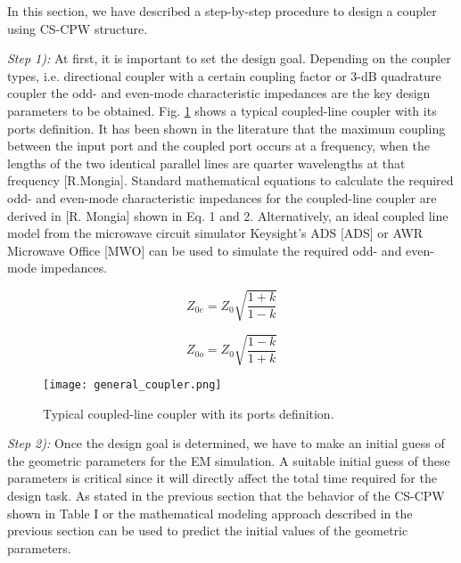 \documentclass[journal]{IEEEtran}
\begin{document}
In this section, we have described a step-by-step procedure to design a coupler using CS-CPW structure. 

\textit{Step 1):} At first, it is important to set the design goal. Depending on the coupler types, i.e. directional coupler with a certain coupling factor or 3-dB quadrature coupler the odd- and even-mode characteristic impedances are the key design parameters to be obtained. Fig. \ref{bcoupler} shows a typical coupled-line coupler with its ports definition. It has been shown in the literature that the maximum coupling between the input port and the coupled port occurs at a frequency, when the lengths of the two identical parallel lines are quarter wavelengths at that frequency [R.Mongia]. Standard mathematical equations to calculate the required odd- and even-mode characteristic impedances for the coupled-line coupler are derived in [R. Mongia] shown in Eq. 1 and 2. Alternatively, an ideal coupled line model from the microwave circuit simulator Keysight's ADS [ADS] or AWR Microwave Office [MWO] can be used to simulate the required odd- and even-mode impedances.

\begin{equation}
Z_{0e}=Z_0 \sqrt{\frac{1+k}{1-k}}
\end{equation}

\begin{equation}
Z_{0o}=Z_0 \sqrt{\frac{1-k}{1+k}}
\end{equation}


\begin{figure}
	\texttt{[image: general\_coupler.png]}
	\caption{Typical coupled-line coupler with its ports definition.}
	\label{bcoupler}
\end{figure}


\textit{Step 2):} Once the design goal is determined, we have to make an initial guess of the geometric parameters for the EM simulation. A suitable initial guess of these parameters is critical since it will directly affect the total time required for the design task. As stated in the previous section that the behavior of the CS-CPW shown in Table I or the mathematical modeling approach described in the previous section can be used to predict the initial values of the geometric parameters.
\end{document}
